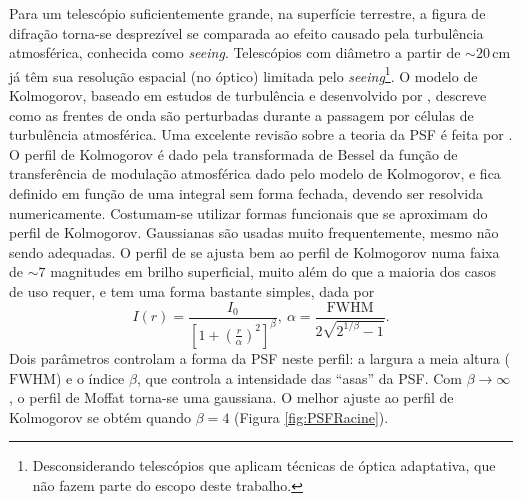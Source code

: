 Para um telescópio suficientemente grande, na superfície terrestre, a figura de
difração torna-se desprezível se comparada ao efeito causado pela turbulência
atmosférica, conhecida como {\em seeing}. Telescópios com diâmetro a partir de
$\sim\!20\,\mathrm{cm}$ já têm sua resolução espacial (no óptico) limitada pelo
{\em seeing}\footnote{Desconsiderando telescópios que aplicam técnicas de óptica
adaptativa, que não fazem parte do escopo deste trabalho.}. O modelo de
Kolmogorov, baseado em estudos de turbulência e desenvolvido por
\citet{Tatarskii1961}, descreve como as frentes de onda são perturbadas durante
a passagem por células de turbulência atmosférica. Uma excelente revisão sobre a
teoria da PSF é feita por \citet{Racine1996}. O perfil de Kolmogorov é dado pela
transformada de Bessel da função de transferência de modulação atmosférica dado
pelo modelo de Kolmogorov, e fica definido em função de uma integral sem forma
fechada, devendo ser resolvida numericamente. Costumam-se utilizar formas
funcionais que se aproximam do perfil de Kolmogorov. Gaussianas são usadas muito
frequentemente, mesmo não sendo adequadas. O perfil de \citet{Moffat1969} se
ajusta bem ao perfil de Kolmogorov numa faixa de $\sim\!7$ magnitudes em brilho
superficial, muito além do que a maioria dos casos de uso requer, e tem uma
forma bastante simples, dada por
\begin{equation*}
I(r) = \frac{I_0}{\left[1 + \left(\frac{r}{\alpha}\right)^2\right]^\beta},
\ \alpha = \frac{\mathrm{FWHM}}{2\sqrt{2^{1/\beta} - 1}}.
\end{equation*}
Dois parâmetros controlam a forma da PSF neste perfil: a largura a meia altura
($\mathrm{FWHM}$) e o índice $\beta$, que controla a intensidade das ``asas'' da
PSF. Com $\beta\!\to\!\infty$, o perfil de Moffat torna-se uma gaussiana. O
melhor ajuste ao perfil de Kolmogorov se obtém quando $\beta\!=\!4$ (Figura
\ref{fig:PSFRacine}).

